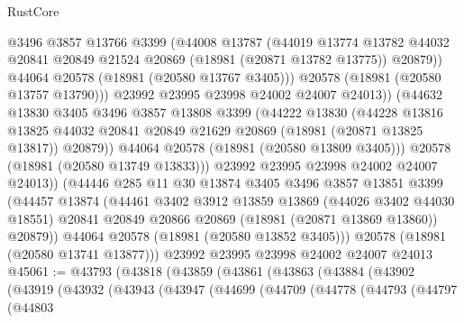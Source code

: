 \begin{lexlean}{RustCore}
\begin{coremodule}
                    @3496
                    @3857
                    @13766
                    @3399
                    (@44008
                      @13787
                      (@44019
                        @13774
                        @13782
                        @44032
                        @20841
                        @20849
                        @21524
                        @20869
                        (@18981 (@20871 @13782 @13775))
                        @20879))
                    @44064
                    @20578
                    (@18981 (@20580 @13767 @3405)))
                  @20578
                  (@18981 (@20580 @13757 @13790)))
                @23992
                @23995
                @23998
                @24002
                @24007
                @24013))
            (@44632
              @13830
              @3405
              @3496
              @3857
              @13808
              @3399
              (@44222
                @13830
                (@44228
                  @13816
                  @13825
                  @44032
                  @20841
                  @20849
                  @21629
                  @20869
                  (@18981 (@20871 @13825 @13817))
                  @20879))
              @44064
              @20578
              (@18981 (@20580 @13809 @3405)))
            @20578
            (@18981 (@20580 @13749 @13833)))
          @23992
          @23995
          @23998
          @24002
          @24007
          @24013))
      (@44446
        @285
        @11
        @30
        @13874
        @3405
        @3496
        @3857
        @13851
        @3399
        (@44457
          @13874
          (@44461
            @3402
            @3912
            @13859
            @13869
            (@44026 @3402 @44030 @18551)
            @20841
            @20849
            @20866
            @20869
            (@18981 (@20871 @13869 @13860))
            @20879))
        @44064
        @20578
        (@18981 (@20580 @13852 @3405)))
      @20578
      (@18981 (@20580 @13741 @13877)))
    @23992
    @23995
    @23998
    @24002
    @24007
    @24013
@45061 := @43793
    (@43818
      (@43859
        (@43861
          (@43863
            (@43884
              (@43902
                (@43919
                  (@43932
                    (@43943
                      (@43947
                        (@44699
                          (@44709
                            (@44778
                              (@44793
                                (@44797
                                  (@44803

\end{coremodule}
\end{lexlean}
